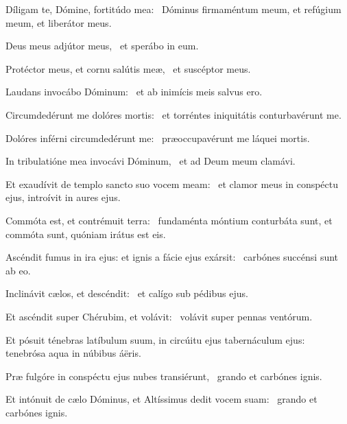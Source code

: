 \item Díligam te, Dómine, fortitúdo mea:~\psstar{} Dóminus firmaméntum meum, et refúgium meum, et liberátor meus.

\item Deus meus adjútor meus,~\psstar{} et sperábo in eum.

\item Protéctor meus, et cornu salútis meæ,~\psstar{} et suscéptor meus.

\item Laudans invocábo Dóminum:~\psstar{} et ab inimícis meis salvus ero.

\item Circumdedérunt me dolóres mortis:~\psstar{} et torréntes iniquitátis conturbavérunt me.

\item Dolóres inférni circumdedérunt me:~\psstar{} præoccupavérunt me láquei mortis.

\item In tribulatióne mea invocávi Dóminum,~\psstar{} et ad Deum meum clamávi.

\item Et exaudívit de templo sancto suo vocem meam:~\psstar{} et clamor meus in conspéctu ejus, introívit in aures ejus.

\item Commóta est, et contrémuit terra:~\psstar{} fundaménta móntium conturbáta sunt, et commóta sunt, quóniam irátus est eis.

\item Ascéndit fumus in ira ejus: et ignis a fácie ejus exársit:~\psstar{} carbónes succénsi sunt ab eo.

\item Inclinávit cælos, et descéndit:~\psstar{} et calígo sub pédibus ejus.

\item Et ascéndit super Chérubim, et volávit:~\psstar{} volávit super pennas ventórum.

\item Et pósuit ténebras latíbulum suum, in circúitu ejus tabernáculum ejus:~\psstar{} tenebrósa aqua in núbibus áëris.

\item Præ fulgóre in conspéctu ejus nubes transiérunt,~\psstar{} grando et carbónes ignis.

\item Et intónuit de cælo Dóminus, et Altíssimus dedit vocem suam:~\psstar{} grando et carbónes ignis.

